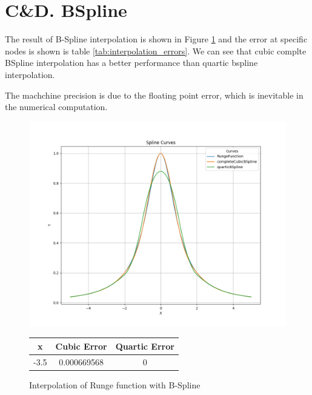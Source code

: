 \documentclass[a4paper]{article}
\begin{document}
\newpage

\section*{C\&D. BSpline}

The result of B-Spline interpolation is shown in Figure \ref{fig:bspline_interpolation} and the error at specific nodes is shown is table \ref{tab:interpolation_errors}. We can see that cubic complte BSpline interpolation has a better performance than quartic bspline interpolation.

The machchine precision is due to the floating point error, which is inevitable in the numerical computation.

\begin{figure}[h]
  \centering
  \begin{minipage}{0.6\textwidth} %
    \centering
    \includegraphics[width=\linewidth]{figures/C.png}
    \caption{Interpolation of Runge function with B-Spline}
    \label{fig:bspline_interpolation}
  \end{minipage}
  \hfill
  \begin{minipage}{0.35\textwidth} %
    \centering
    \renewcommand{\arraystretch}{1.2} %
    \begin{tabular}{|c|c|c|}
      \hline
      \textbf{x} & \textbf{Cubic Error} & \textbf{Quartic Error} \\ \hline
      -3.5       & 0.000669568                    & 0                                \\ \hline

\end{tabular}
\end{minipage}
\end{figure}
\end{document}
